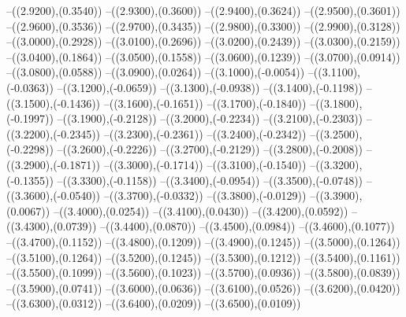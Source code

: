 {	--({\sx*(2.9200)},{\sy*(0.3540)})
	--({\sx*(2.9300)},{\sy*(0.3600)})
	--({\sx*(2.9400)},{\sy*(0.3624)})
	--({\sx*(2.9500)},{\sy*(0.3601)})
	--({\sx*(2.9600)},{\sy*(0.3536)})
	--({\sx*(2.9700)},{\sy*(0.3435)})
	--({\sx*(2.9800)},{\sy*(0.3300)})
	--({\sx*(2.9900)},{\sy*(0.3128)})
	--({\sx*(3.0000)},{\sy*(0.2928)})
	--({\sx*(3.0100)},{\sy*(0.2696)})
	--({\sx*(3.0200)},{\sy*(0.2439)})
	--({\sx*(3.0300)},{\sy*(0.2159)})
	--({\sx*(3.0400)},{\sy*(0.1864)})
	--({\sx*(3.0500)},{\sy*(0.1558)})
	--({\sx*(3.0600)},{\sy*(0.1239)})
	--({\sx*(3.0700)},{\sy*(0.0914)})
	--({\sx*(3.0800)},{\sy*(0.0588)})
	--({\sx*(3.0900)},{\sy*(0.0264)})
	--({\sx*(3.1000)},{\sy*(-0.0054)})
	--({\sx*(3.1100)},{\sy*(-0.0363)})
	--({\sx*(3.1200)},{\sy*(-0.0659)})
	--({\sx*(3.1300)},{\sy*(-0.0938)})
	--({\sx*(3.1400)},{\sy*(-0.1198)})
	--({\sx*(3.1500)},{\sy*(-0.1436)})
	--({\sx*(3.1600)},{\sy*(-0.1651)})
	--({\sx*(3.1700)},{\sy*(-0.1840)})
	--({\sx*(3.1800)},{\sy*(-0.1997)})
	--({\sx*(3.1900)},{\sy*(-0.2128)})
	--({\sx*(3.2000)},{\sy*(-0.2234)})
	--({\sx*(3.2100)},{\sy*(-0.2303)})
	--({\sx*(3.2200)},{\sy*(-0.2345)})
	--({\sx*(3.2300)},{\sy*(-0.2361)})
	--({\sx*(3.2400)},{\sy*(-0.2342)})
	--({\sx*(3.2500)},{\sy*(-0.2298)})
	--({\sx*(3.2600)},{\sy*(-0.2226)})
	--({\sx*(3.2700)},{\sy*(-0.2129)})
	--({\sx*(3.2800)},{\sy*(-0.2008)})
	--({\sx*(3.2900)},{\sy*(-0.1871)})
	--({\sx*(3.3000)},{\sy*(-0.1714)})
	--({\sx*(3.3100)},{\sy*(-0.1540)})
	--({\sx*(3.3200)},{\sy*(-0.1355)})
	--({\sx*(3.3300)},{\sy*(-0.1158)})
	--({\sx*(3.3400)},{\sy*(-0.0954)})
	--({\sx*(3.3500)},{\sy*(-0.0748)})
	--({\sx*(3.3600)},{\sy*(-0.0540)})
	--({\sx*(3.3700)},{\sy*(-0.0332)})
	--({\sx*(3.3800)},{\sy*(-0.0129)})
	--({\sx*(3.3900)},{\sy*(0.0067)})
	--({\sx*(3.4000)},{\sy*(0.0254)})
	--({\sx*(3.4100)},{\sy*(0.0430)})
	--({\sx*(3.4200)},{\sy*(0.0592)})
	--({\sx*(3.4300)},{\sy*(0.0739)})
	--({\sx*(3.4400)},{\sy*(0.0870)})
	--({\sx*(3.4500)},{\sy*(0.0984)})
	--({\sx*(3.4600)},{\sy*(0.1077)})
	--({\sx*(3.4700)},{\sy*(0.1152)})
	--({\sx*(3.4800)},{\sy*(0.1209)})
	--({\sx*(3.4900)},{\sy*(0.1245)})
	--({\sx*(3.5000)},{\sy*(0.1264)})
	--({\sx*(3.5100)},{\sy*(0.1264)})
	--({\sx*(3.5200)},{\sy*(0.1245)})
	--({\sx*(3.5300)},{\sy*(0.1212)})
	--({\sx*(3.5400)},{\sy*(0.1161)})
	--({\sx*(3.5500)},{\sy*(0.1099)})
	--({\sx*(3.5600)},{\sy*(0.1023)})
	--({\sx*(3.5700)},{\sy*(0.0936)})
	--({\sx*(3.5800)},{\sy*(0.0839)})
	--({\sx*(3.5900)},{\sy*(0.0741)})
	--({\sx*(3.6000)},{\sy*(0.0636)})
	--({\sx*(3.6100)},{\sy*(0.0526)})
	--({\sx*(3.6200)},{\sy*(0.0420)})
	--({\sx*(3.6300)},{\sy*(0.0312)})
	--({\sx*(3.6400)},{\sy*(0.0209)})
	--({\sx*(3.6500)},{\sy*(0.0109)})
}
